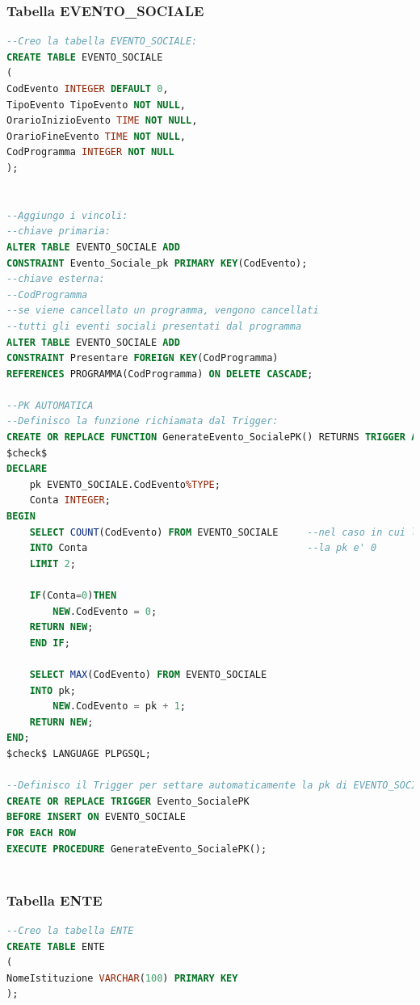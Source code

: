 \documentclass[a4page]{article}
\begin{document}
\subsubsection{Tabella EVENTO\_SOCIALE}
\begin{lstlisting}[language=SQL,
        deletekeywords={IDENTITY,INT},
        morekeywords={clustered},    
        framesep=10pt,
        framextopmargin=10pt]
--Creo la tabella EVENTO_SOCIALE: 
CREATE TABLE EVENTO_SOCIALE
(
CodEvento INTEGER DEFAULT 0,
TipoEvento TipoEvento NOT NULL,
OrarioInizioEvento TIME NOT NULL,
OrarioFineEvento TIME NOT NULL,
CodProgramma INTEGER NOT NULL
);


--Aggiungo i vincoli:
--chiave primaria:
ALTER TABLE EVENTO_SOCIALE ADD 
CONSTRAINT Evento_Sociale_pk PRIMARY KEY(CodEvento);
--chiave esterna:
--CodProgramma
--se viene cancellato un programma, vengono cancellati
--tutti gli eventi sociali presentati dal programma
ALTER TABLE EVENTO_SOCIALE ADD 
CONSTRAINT Presentare FOREIGN KEY(CodProgramma)
REFERENCES PROGRAMMA(CodProgramma) ON DELETE CASCADE;

--PK AUTOMATICA
--Definisco la funzione richiamata dal Trigger:
CREATE OR REPLACE FUNCTION GenerateEvento_SocialePK() RETURNS TRIGGER AS
$check$
DECLARE
	pk EVENTO_SOCIALE.CodEvento%TYPE;
	Conta INTEGER;
BEGIN
	SELECT COUNT(CodEvento) FROM EVENTO_SOCIALE		--nel caso in cui la tabella sia vuota
	INTO Conta										--la pk e' 0
	LIMIT 2;
	
	IF(Conta=0)THEN				
		NEW.CodEvento = 0;	
	RETURN NEW;
	END IF;
	
	SELECT MAX(CodEvento) FROM EVENTO_SOCIALE
	INTO pk;
		NEW.CodEvento = pk + 1;
	RETURN NEW;
END;
$check$ LANGUAGE PLPGSQL;

--Definisco il Trigger per settare automaticamente la pk di EVENTO_SOCIALE:
CREATE OR REPLACE TRIGGER Evento_SocialePK
BEFORE INSERT ON EVENTO_SOCIALE
FOR EACH ROW
EXECUTE PROCEDURE GenerateEvento_SocialePK();
        

\end{lstlisting}
\subsubsection{Tabella ENTE}
\begin{lstlisting}[language=SQL,
        deletekeywords={IDENTITY,INT},
        morekeywords={clustered},    
        framesep=10pt,
        framextopmargin=10pt]
--Creo la tabella ENTE
CREATE TABLE ENTE
(
NomeIstituzione VARCHAR(100) PRIMARY KEY
);
        

\end{lstlisting}
\end{document}
